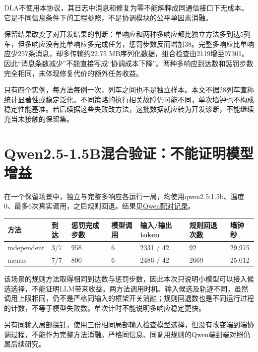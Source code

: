 DLA不使用本协议，其日志中消息和修复为零不能解释成同通信接口下无成本。它是不同信息条件下的工程参照，不是协调模块的公平单因素消融。

保留结果改变了对开发结果的判断：单响应和两种多响应都比独立方法多到达5列车，但多响应没有比单响应多完成任务，惩罚步数反而增加38。完整多响应比单响应少257条消息，却多传输约22.75
MB序列化数据，组合检查由2119增至97301。因此``消息条数减少''不能直接写成``协调成本下降''。两种多响应到达数和惩罚步数完全相同，未体现修复代价的额外任务收益。

只有四个实例，每方法每例一次，列车之间也不是独立样本。本文不据28列车宣称统计显著性或稳定泛化。不同策略的执行相关故障仍可能不同，单次墙钟也不构成稳定性能基准。若后续据这些失败改方法，这批数据就应转为开发诊断，不能继续充当未接触的保留集。

\hypertarget{qwen2.5-1.5bux6df7ux5408ux9a8cux8bc1ux4e0dux80fdux8bc1ux660eux6a21ux578bux589eux76ca}{%
\section{Qwen2.5-1.5B混合验证：不能证明模型增益}\label{qwen2.5-1.5bux6df7ux5408ux9a8cux8bc1ux4e0dux80fdux8bc1ux660eux6a21ux578bux589eux76ca}}

在一个保留场景中，独立与完整多响应各运行一局，均使用qwen2.5:1.5b、温度0、最多6次真实调用，之后规则回退。结果见\href{../expr/004-distributed-agent-core/runs/qwen-holdout-pair.json}{Qwen配对记录}。

\begin{longtable}[]{@{}lllllll@{}}
\toprule
方法 & 到达 & 惩罚完成步数 & 模型调用 & 输入/输出token & 规则回退次数 & 墙钟秒 \\
\midrule
\endhead
independent & 3/7 & 958 & 6 & 2331 / 42 & 92 & 29.975 \\
menus & 7/7 & 800 & 6 & 2486 / 42 & 2669 & 25.012 \\
\bottomrule
\end{longtable}

该场景的规则方法取得相同到达数与惩罚步数，因此本次只说明小模型可以接入候选选择，不能证明LLM带来收益。两方法调用时机、输入候选及轨迹不同，虽然调用上限相同，仍不是严格同输入的框架开关消融；规则回退数也是不同运行过程的计数，不等于模型失败数。单次计时不能说明多响应稳定更快。

另有\href{../expr/004-distributed-agent-core/runs/qwen-matched-probe.json}{同输入局部探针}，使用三份相同局部输入检查模型选择，但没有改变端到端协调过程，不能作为完整方法消融。严格同信息、同调用规则的Qwen端到端对照仍属后续研究。

